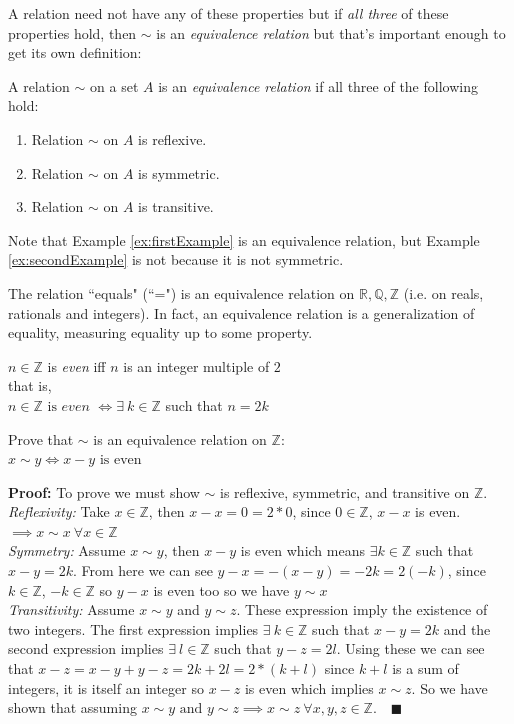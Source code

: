 A relation need not have any of these properties but if \textit{all three} of these properties hold,
then $\sim$ is an \textit{equivalence relation} but that's important enough to get its own
definition:
\begin{definition}
A relation $\sim$ on a set $A$ is an \textit{equivalence relation} if all three of the following
hold:
\begin{enumerate}[label=\roman*)]
    \item Relation $\sim$ on $A$ is reflexive.
    \item Relation $\sim$ on $A$ is symmetric.
    \item Relation $\sim$ on $A$ is transitive.
\end{enumerate}
\end{definition}
Note that Example \ref{ex:firstExample} is an equivalence relation, but Example
\ref{ex:secondExample} is not because it is not symmetric.
\newpage
\begin{example}
The relation ``equals" (``=") is an equivalence relation on $\mathbb{R}, \mathbb{Q}, \mathbb{Z}$
(i.e. on reals, rationals and integers). In fact, an equivalence relation is a generalization of
equality, measuring equality up to some property.
\end{example}
\begin{definition}[Even]\label{def:even}
$n\in \mathbb{Z}$ is \textit{even} iff $n$ is an integer multiple of $2$ \\
that is, \\
$n\in \mathbb{Z} \text{ is}\textit{ even }\Leftrightarrow \exists \ k \in \mathbb{Z}$ such that
$n=2k$
\end{definition}
\begin{example}
Prove that $\sim$ is an equivalence relation on $\mathbb{Z}$:\\
$x\sim y \iff x-y \text{ is even}$\steezybreak

\noindent\textbf{Proof:} To prove we must show $\sim$ is reflexive, symmetric, and transitive on
$\mathbb{Z}$.\\
\textit{Reflexivity:} Take $x\in \mathbb{Z}$, then $x-x=0=2*0$, since $0\in \mathbb{Z}$, $x-x$ is
even. $\implies x\sim x \ \forall x \in \mathbb{Z}$\\
\textit{Symmetry:} Assume $x\sim y$, then $x-y$ is even which means $\exists k \in \mathbb{Z}$ such
that $x-y=2k$. From here we can see $y-x=-(x-y)=-2k=2(-k)$, since $k\in \mathbb{Z}$,
$-k\in \mathbb{Z}$ so $y-x$ is even too so we have $y\sim x$\\
\textit{Transitivity:} Assume $x\sim y$ and $y \sim z$. These expression imply the existence of two
integers. The first expression implies $\exists \ k\in \mathbb{Z}$ such that $x-y=2k$ and the second
expression implies $\exists \ l \in \mathbb{Z}$ such that $y-z=2l$. Using these we can see that
$x-z=x-y+y-z=2k+2l=2*(k+l)$ since $k+l$ is a sum of integers, it is itself an integer so $x-z$ is
even which implies $x\sim z$. So we have shown that assuming
$x\sim y \text{ and } y\sim z \implies x\sim z \ \forall x,y,z \in \mathbb{Z}$. $\ \ \ \blacksquare$
\end{example}
